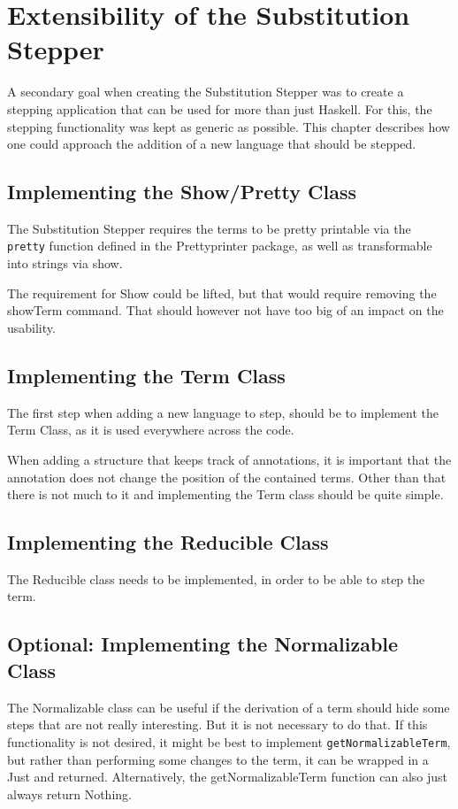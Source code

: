 \chapter{Extensibility of the Substitution Stepper}
A secondary goal when creating the Substitution Stepper was to create a stepping application that can be used for more than just Haskell.
For this, the stepping functionality was kept as generic as possible.
This chapter describes how one could approach the addition of a new language that should be stepped.

\section{Implementing the Show/Pretty Class}
The Substitution Stepper requires the terms to be pretty printable via the \texttt{pretty} function defined in the Prettyprinter package,
as well as transformable into strings via show.

The requirement for Show could be lifted,
but that would require removing the showTerm command.
That should however not have too big of an impact on the usability.

\section{Implementing the Term Class}
The first step when adding a new language to step,
should be to implement the Term Class,
as it is used everywhere across the code.

When adding a structure that keeps track of annotations,
it is important that the annotation does not change the position of the contained terms.
Other than that there is not much to it and implementing the Term class should be quite simple.

\section{Implementing the Reducible Class}
The Reducible class needs to be implemented,
in order to be able to step the term.

\section{Optional: Implementing the Normalizable Class}
The Normalizable class can be useful if the derivation of a term should hide some steps that are not really interesting.
But it is not necessary to do that.
If this functionality is not desired,
it might be best to implement \texttt{getNormalizableTerm},
but rather than performing some changes to the term,
it can be wrapped in a Just and returned.
Alternatively,
the getNormalizableTerm function can also just always return Nothing.


